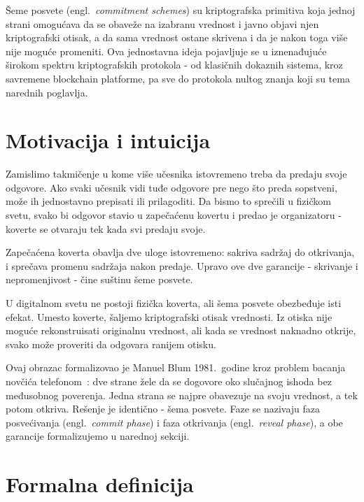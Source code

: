 
Šeme posvete (engl.\ \textit{commitment schemes}) su kriptografska primitiva koja jednoj strani
omogućava da se obaveže na izabranu vrednost i javno objavi njen kriptografski otisak, a da
sama vrednost ostane skrivena i da je nakon toga više nije moguće promeniti.
Ova jednostavna ideja pojavljuje se u iznenađujuće širokom spektru kriptografskih protokola
- od klasičnih dokaznih sistema, kroz savremene blockchain platforme, pa sve do protokola
nultog znanja koji su tema narednih poglavlja.

\section{Motivacija i intuicija}
\label{sec:commitments-motivacija}

Zamislimo takmičenje u kome više učesnika istovremeno treba da predaju svoje odgovore.
Ako svaki učesnik vidi tuđe odgovore pre nego što preda sopstveni, može ih jednostavno
prepisati ili prilagoditi. Da bismo to sprečili u fizičkom svetu, svako bi odgovor stavio
u zapečaćenu kovertu i predao je organizatoru - koverte se otvaraju tek kada svi predaju
svoje.

Zapečaćena koverta obavlja dve uloge istovremeno: sakriva sadržaj do otkrivanja, i sprečava
promenu sadržaja nakon predaje. Upravo ove dve garancije - skrivanje i nepromenjivost -
čine suštinu šeme posvete.

U digitalnom svetu ne postoji fizička koverta, ali šema posvete obezbeđuje isti efekat.
Umesto koverte, šaljemo kriptografski otisak vrednosti. Iz otiska nije moguće rekonstruisati
originalnu vrednost, ali kada se vrednost naknadno otkrije, svako može proveriti da odgovara
ranijem otisku.

Ovaj obrazac formalizovao je Manuel Blum 1981.\ godine kroz problem bacanja novčića
telefonom~\cite{blum1981coin}: dve strane žele da se dogovore oko slučajnog ishoda bez
međusobnog poverenja. Jedna strana se najpre obavezuje na svoju vrednost, a tek potom otkriva. Rešenje je identično - šema posvete. Faze se nazivaju faza posvećivanja
(engl.\ \textit{commit phase}) i faza otkrivanja (engl.\ \textit{reveal phase}),
a obe garancije formalizujemo u narednoj sekciji.

\section{Formalna definicija}
\label{sec:commitments-definicija}

